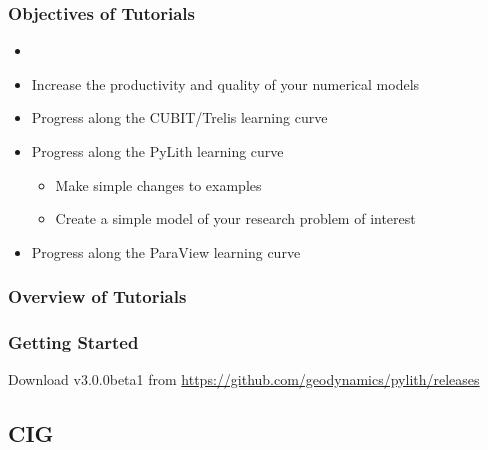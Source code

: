 \documentclass[aspectratio=169]{beamer}
\begin{document}
\begin{frame}
  \frametitle{Objectives of Tutorials}
  \summary{}
  
  \begin{itemize}
  \item {}
  \item Increase the productivity and quality of your numerical models
  \item Progress along the CUBIT/Trelis learning curve
  \item Progress along the PyLith learning curve
    \begin{itemize}
    \item Make simple changes to examples
    \item Create a simple model of your research problem of interest
    \end{itemize}
  \item Progress along the ParaView learning curve
  \end{itemize}

\end{frame}


\begin{frame}
  \frametitle{Overview of Tutorials}
  
  

\end{frame}


\begin{frame}
  \frametitle{Getting Started}
  
  Download v3.0.0beta1 from
  \url{https://github.com/geodynamics/pylith/releases}

\end{frame}


\subsection{CIG}
\end{document}
